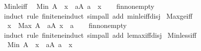 \begin{isabellebody}
\endisatagproof
{\isafoldproof}%
%
\isadelimproof
\isanewline
%
\endisadelimproof
\isanewline
{}\isamarkupfalse%
\ Min{\isacharunderscore}{\kern0pt}le{\isacharunderscore}{\kern0pt}iff{\isacharcolon}{\kern0pt}\isanewline
\ \ {\isachardoublequoteopen}Min\ A\ {\isasymle}\ x\ {\isasymlongleftrightarrow}\ {\isacharparenleft}{\kern0pt}{\isasymexists}a{\isasymin}A{\isachardot}{\kern0pt}\ a\ {\isasymle}\ x{\isacharparenright}{\kern0pt}{\isachardoublequoteclose}\isanewline
%
\isadelimproof
\ \ %
\endisadelimproof
%
\isatagproof
{}\isamarkupfalse%
\ fin{\isacharunderscore}{\kern0pt}nonempty\ \isamarkupfalse%
\ {\isacharparenleft}{\kern0pt}induct\ rule{\isacharcolon}{\kern0pt}\ finite{\isacharunderscore}{\kern0pt}ne{\isacharunderscore}{\kern0pt}induct{\isacharparenright}{\kern0pt}\ {\isacharparenleft}{\kern0pt}simp{\isacharunderscore}{\kern0pt}all\ add{\isacharcolon}{\kern0pt}\ min{\isacharunderscore}{\kern0pt}le{\isacharunderscore}{\kern0pt}iff{\isacharunderscore}{\kern0pt}disj{\isacharparenright}{\kern0pt}%
\endisatagproof
{\isafoldproof}%
%
\isadelimproof
\isanewline
%
\endisadelimproof
\isanewline
{}\isamarkupfalse%
\ Max{\isacharunderscore}{\kern0pt}ge{\isacharunderscore}{\kern0pt}iff{\isacharcolon}{\kern0pt}\isanewline
\ \ {\isachardoublequoteopen}x\ {\isasymle}\ Max\ A\ {\isasymlongleftrightarrow}\ {\isacharparenleft}{\kern0pt}{\isasymexists}a{\isasymin}A{\isachardot}{\kern0pt}\ x\ {\isasymle}\ a{\isacharparenright}{\kern0pt}{\isachardoublequoteclose}\isanewline
%
\isadelimproof
\ \ %
\endisadelimproof
%
\isatagproof
{}\isamarkupfalse%
\ fin{\isacharunderscore}{\kern0pt}nonempty\ \isamarkupfalse%
\ {\isacharparenleft}{\kern0pt}induct\ rule{\isacharcolon}{\kern0pt}\ finite{\isacharunderscore}{\kern0pt}ne{\isacharunderscore}{\kern0pt}induct{\isacharparenright}{\kern0pt}\ {\isacharparenleft}{\kern0pt}simp{\isacharunderscore}{\kern0pt}all\ add{\isacharcolon}{\kern0pt}\ le{\isacharunderscore}{\kern0pt}max{\isacharunderscore}{\kern0pt}iff{\isacharunderscore}{\kern0pt}disj{\isacharparenright}{\kern0pt}%
\endisatagproof
{\isafoldproof}%
%
\isadelimproof
\isanewline
%
\endisadelimproof
\isanewline
{}\isamarkupfalse%
\ Min{\isacharunderscore}{\kern0pt}less{\isacharunderscore}{\kern0pt}iff{\isacharcolon}{\kern0pt}\isanewline
\ \ {\isachardoublequoteopen}Min\ A\ {\isacharless}{\kern0pt}\ x\ {\isasymlongleftrightarrow}\ {\isacharparenleft}{\kern0pt}{\isasymexists}a{\isasymin}A{\isachardot}{\kern0pt}\ a\ {\isacharless}{\kern0pt}\ x{\isacharparenright}{\kern0pt}{\isachardoublequoteclose}\isanewline

\end{isabellebody}
